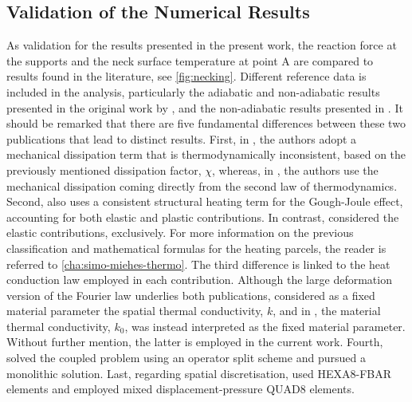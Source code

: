 \subsection{Validation of the Numerical Results}

As validation for the results presented in the present work, the reaction force at the supports and the neck surface temperature at point A are compared to results found in the literature, see \ref{fig:necking}.
Different reference data is included in the analysis, particularly the adiabatic and non-adiabatic results presented in the original work by \cite{simo_associative_1992}, and the non-adiabatic results presented in \cite{danowski_computational_2014}.
It should be remarked that there are five fundamental differences between these two publications that lead to distinct results.
First, in \cite{simo_associative_1992}, the authors adopt a mechanical dissipation term that is thermodynamically inconsistent, based on the previously mentioned dissipation factor, $\chi$, whereas, in \cite{danowski_computational_2014}, the authors use the mechanical dissipation coming directly from the second law of thermodynamics.
Second, \cite{danowski_computational_2014} also uses a consistent structural heating term for the Gough-Joule effect, accounting for both elastic and plastic contributions.
In contrast, \cite{simo_associative_1992} considered the elastic contributions, exclusively.
For more information on the previous classification and mathematical formulas for the heating parcels, the reader is referred to \ref{cha:simo-miehes-thermo}.
The third difference is linked to the heat conduction law employed in each contribution.
Although the large deformation version of the Fourier law underlies both publications, \cite{simo_associative_1992} considered as a fixed material parameter the spatial thermal conductivity, $k$, and in \cite{danowski_computational_2014}, the material thermal conductivity, $k_{0}$, was instead interpreted as the fixed material parameter.
Without further mention, the latter is employed in the current work.
Fourth, \cite{simo_associative_1992} solved the coupled problem using an operator split scheme and \cite{danowski_computational_2014} pursued a monolithic solution.
Last, regarding  spatial discretisation, \cite{danowski_computational_2014} used HEXA8-FBAR elements and \cite{simo_associative_1992} employed mixed displacement-pressure QUAD8 elements.

